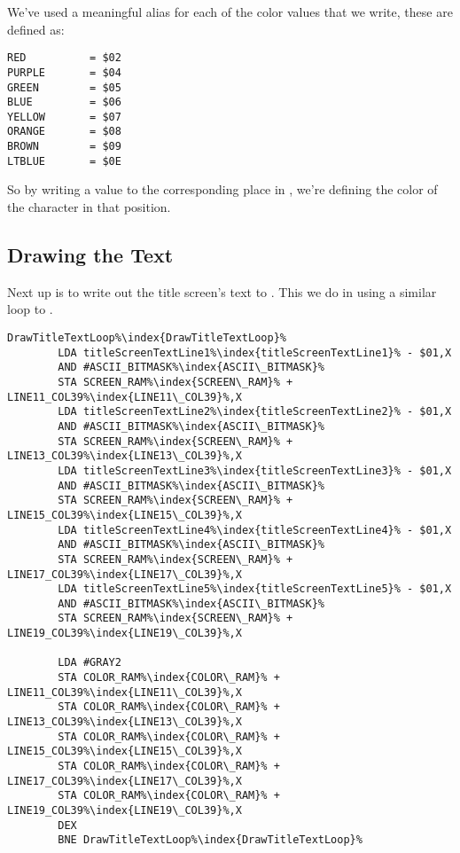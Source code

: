We've used a meaningful alias for each of the color values that we write, these are defined as:

\begin{lstlisting}
RED          = $02
PURPLE       = $04
GREEN        = $05
BLUE         = $06
YELLOW       = $07
ORANGE       = $08
BROWN        = $09
LTBLUE       = $0E
\end{lstlisting}

So by writing a value to the corresponding place in , we're defining the color of the character
in that position.



\subsection{Drawing the Text}

Next up is to write out the title screen's text to . This we do in 
using a similar loop to . 

\begin{lstlisting}[caption=In \icode{DrawTitleScreenText\index{DrawTitleScreenText}},escapechar=\%]
DrawTitleTextLoop%\index{DrawTitleTextLoop}%   
        LDA titleScreenTextLine1%\index{titleScreenTextLine1}% - $01,X
        AND #ASCII_BITMASK%\index{ASCII\_BITMASK}%
        STA SCREEN_RAM%\index{SCREEN\_RAM}% + LINE11_COL39%\index{LINE11\_COL39}%,X
        LDA titleScreenTextLine2%\index{titleScreenTextLine2}% - $01,X
        AND #ASCII_BITMASK%\index{ASCII\_BITMASK}%
        STA SCREEN_RAM%\index{SCREEN\_RAM}% + LINE13_COL39%\index{LINE13\_COL39}%,X
        LDA titleScreenTextLine3%\index{titleScreenTextLine3}% - $01,X
        AND #ASCII_BITMASK%\index{ASCII\_BITMASK}%
        STA SCREEN_RAM%\index{SCREEN\_RAM}% + LINE15_COL39%\index{LINE15\_COL39}%,X
        LDA titleScreenTextLine4%\index{titleScreenTextLine4}% - $01,X
        AND #ASCII_BITMASK%\index{ASCII\_BITMASK}%
        STA SCREEN_RAM%\index{SCREEN\_RAM}% + LINE17_COL39%\index{LINE17\_COL39}%,X
        LDA titleScreenTextLine5%\index{titleScreenTextLine5}% - $01,X
        AND #ASCII_BITMASK%\index{ASCII\_BITMASK}%
        STA SCREEN_RAM%\index{SCREEN\_RAM}% + LINE19_COL39%\index{LINE19\_COL39}%,X

        LDA #GRAY2
        STA COLOR_RAM%\index{COLOR\_RAM}% + LINE11_COL39%\index{LINE11\_COL39}%,X
        STA COLOR_RAM%\index{COLOR\_RAM}% + LINE13_COL39%\index{LINE13\_COL39}%,X
        STA COLOR_RAM%\index{COLOR\_RAM}% + LINE15_COL39%\index{LINE15\_COL39}%,X
        STA COLOR_RAM%\index{COLOR\_RAM}% + LINE17_COL39%\index{LINE17\_COL39}%,X
        STA COLOR_RAM%\index{COLOR\_RAM}% + LINE19_COL39%\index{LINE19\_COL39}%,X
        DEX
        BNE DrawTitleTextLoop%\index{DrawTitleTextLoop}%
\end{lstlisting}

